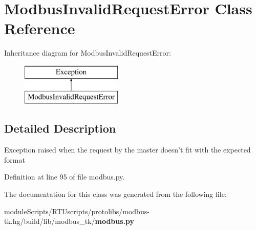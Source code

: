 \section{Modbus\+Invalid\+Request\+Error Class Reference}
\label{classmodbus__tk_1_1modbus_1_1_modbus_invalid_request_error}
Inheritance diagram for Modbus\+Invalid\+Request\+Error\+:\begin{figure}[H]
\begin{center}
\leavevmode
\includegraphics[height=2.000000cm]{classmodbus__tk_1_1modbus_1_1_modbus_invalid_request_error}
\end{center}
\end{figure}


\subsection{Detailed Description}
\begin{DoxyVerb}Exception raised when the request by the master doesn't fit 
with the expected format
\end{DoxyVerb}
 

Definition at line 95 of file modbus.\+py.



The documentation for this class was generated from the following file\+:\begin{DoxyCompactItemize}
\item 
module\+Scripts/\+R\+T\+Uscripts/protolibs/modbus-\/tk.\+hg/build/lib/modbus\+\_\+tk/{\bf modbus.\+py}\end{DoxyCompactItemize}
